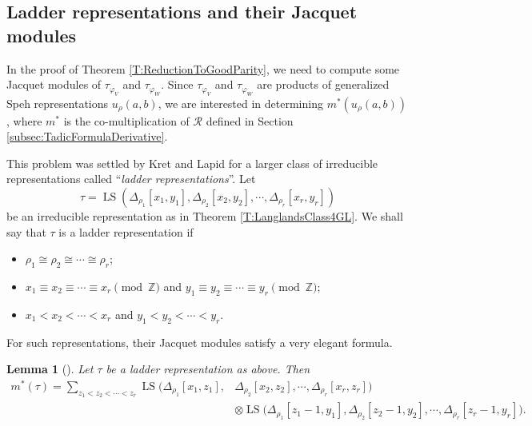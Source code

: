\documentclass[11pt,letterpaper]{amsart}
\theoremstyle{plain}
\newcounter{theorem}[section]
\numberwithin{theorem}{section}
\numberwithin{equation}{subsection}
\newtheorem{Lem}[theorem]{Lemma}
\theoremstyle{remark}
\newcommand{\LS}{\operatorname{LS}} %
\newcommand{\Z}{\mathbb{Z}}
\def\calR{\mathcal{R}}
\begin{document}
\subsection{Ladder representations and their Jacquet modules} %
\label{sub:ladder_representations_and_their_jacquet_modules}

In the proof of Theorem \ref{T:ReductionToGoodParity}, we need to compute some Jacquet modules of $\tau_{\varphi_V}$ and $\tau_{\varphi_W}$. Since $\tau_{\varphi_V}$ and $\tau_{\varphi_W}$ are products of generalized Speh representations $u_\rho\left(a,b\right)$, we are interested in determining $m^*\left(u_\rho\left(a,b\right)\right)$, where $m^*$ is the co-multiplication of $\calR$ defined in Section \ref{subsec:TadicFormulaDerivative}.

\vskip 5pt

This problem was settled by Kret and Lapid \cite[Thm. 2.1]{MR2996769} for a larger class of irreducible representations called ``\emph{ladder representations}''. Let
\[
    \tau=\LS\left(\Delta_{\rho_1}[x_1,y_1],\Delta_{\rho_2}[x_2,y_2],\cdots,\Delta_{\rho_r}[x_r,y_r]\right)
\]
be an irreducible representation as in Theorem \ref{T:LanglandsClass4GL}. We shall say that $\tau$ is a ladder representation if 
\begin{itemize}
    \item $\rho_1\cong\rho_2\cong\cdots\cong\rho_r$;

    \vskip 5pt

    \item $x_1\equiv x_2\equiv\cdots\equiv x_r \pmod \Z$ and $y_1\equiv y_2\equiv\cdots\equiv y_r \pmod \Z$;

    \vskip 5pt

    \item $x_1<x_2<\cdots< x_r$ and $y_1<y_2<\cdots< y_r$.
\end{itemize}
\vskip 5pt
For such representations, their Jacquet modules satisfy a very elegant formula.

\begin{Lem}[{\cite[Thm. 2.1]{MR2996769}}]\label{L:KretLapidJacFormula}
Let $\tau$ be a ladder representation as above. Then
\begin{align*}
    m^*\left(\tau\right) = \sum_{z_1<z_2<\cdots<z_r} \LS\big(\Delta_{\rho_1}[x_1,z_1],&\Delta_{\rho_2}[x_2,z_2],\cdots,\Delta_{\rho_r}[x_r,z_r]\big)\\ 
    &\otimes \LS\big(\Delta_{\rho_1}[z_1-1,y_1],\Delta_{\rho_2}[z_2-1,y_2],\cdots,\Delta_{\rho_r}[z_r-1,y_r]\big).
\end{align*}  
\end{Lem}
\end{document}
